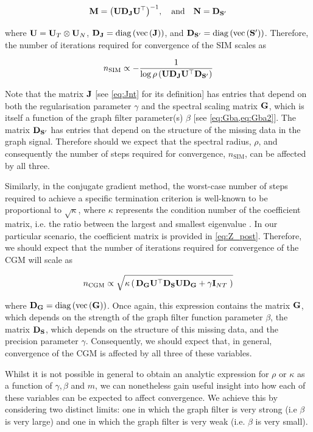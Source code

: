 $$
\mathbf{M} = \big(\mathbf{U} \mathbf{D}_{\mathbf{J}} \mathbf{U}^\top\big)^{-1}, \quad \text{and} \quad \mathbf{N} = \mathbf{D}_{\mathbf{S}'}
$$

where  $\mathbf{U} = \mathbf{U}_T \otimes \mathbf{U}_N$, $\mathbf{D}_{\mathbf{J}} = \text{\textup{diag}}\left(\text{\textup{vec}}\left(\mathbf{J}\right)\right)$, and $\mathbf{D}_{\mathbf{S}'} = \text{\textup{diag}}\left(\text{\textup{vec}}\left(\mathbf{S}'\right)\right)$. Therefore, the number of iterations required for convergence of the SIM scales as


\begin{equation}
    \label{eq:n_SIM}
    n_\text{SIM} \propto  -\frac{1}{\log\rho\left(\mathbf{U} \mathbf{D}_{\mathbf{J}} \mathbf{U}^\top \mathbf{D}_{\mathbf{S}'} \right)}
\end{equation}

Note that the matrix $\mathbf{J}$ [see \cref{eq:Jnt} for its definition] has entries that depend on both the regularisation parameter $\gamma$ and the spectral scaling matrix $\mathbf{G}$, which is itself a function of the graph filter parameter(s) $\beta$ [see \cref{eq:Gba,eq:Gba2}]. The matrix $\mathbf{D}_{\mathbf{S}'}$ has entries that depend on the structure of the missing data in the graph signal. Therefore should we expect that the spectral radius, $\rho$, and consequently the number of steps required for convergence, $n_\text{SIM}$, can be affected by all three.  

Similarly, in the conjugate gradient method, the worst-case number of steps required to achieve a specific termination criterion is well-known to be proportional to $\sqrt{\kappa}$, where $\kappa$ represents the condition number of the coefficient matrix, i.e. the ratio between the largest and smallest eigenvalue \cite{Kelley1995}. In our particular scenario, the coefficient matrix is provided in \cref{eq:Z_post}. Therefore, we should expect that the number of iterations required for convergence of the CGM will scale as

\begin{equation}
    \label{eq:n_CGM}
     n_\text{CGM} \propto \sqrt{\kappa \left(  \, \mathbf{D}_{\mathbf{G}} \mathbf{U}^\top \mathbf{D}_{\mathbf{S}} \mathbf{U} \mathbf{D}_{\mathbf{G}} + \gamma \mathbf{I}_{NT} \; \right)}
\end{equation}

where $\mathbf{D}_{\mathbf{G}} = \text{\textup{diag}}\left(\text{\textup{vec}}\left(\mathbf{G}\right)\right)$. Once again, this expression contains the matrix $\mathbf{G}$, which depends on the strength of the graph filter function parameter $\beta$, the matrix $\mathbf{D}_{\mathbf{S}}$, which depends on the structure of this missing data, and the precision parameter $\gamma$. Consequently, we should expect that, in general, convergence of the CGM is affected by all three of these variables. 

Whilst it is not possible in general to obtain an analytic expression for $\rho$ or $\kappa$ as a function of $\gamma, \beta$ and $m$, we can nonetheless gain useful insight into how each of these variables can be expected to affect convergence. We achieve this by considering two distinct limits: one in which the graph filter is very strong (i.e $\beta$ is very large) and one in which the graph filter is very weak (i.e. $\beta$ is very small). 


